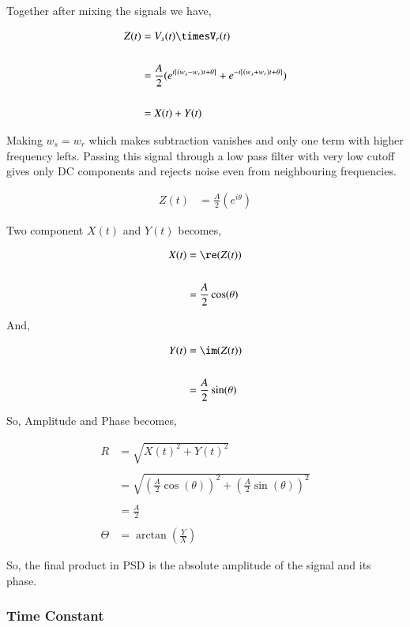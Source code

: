 Together after mixing the signals we have,

\begin{align*}
Z(t) & = V_s(t)\timesV_r(t)\\
\\
& = \frac{A}{2}(e^{i\left[ (w_s-w_r)t+\theta \right]}+e^{-i\left[ (w_s+w_r)t+\theta \right]})\\
\\
& = X(t)+Y(t)
\end{align*}

Making $w_s=w_r$ which makes subtraction vanishes and only one term with higher frequency lefts. Passing this signal through a low pass filter with very low cutoff gives only DC components and rejects noise even from neighbouring frequencies.


\begin{align*}
Z(t) & = \frac{A}{2}(e^{i \theta})
\end{align*}

Two component $X(t)$ and $Y(t)$ becomes,

\begin{align*}
X(t) & =\re(Z(t))\\
\\
& =  \frac{A}{2}\cos(\theta)
\end{align*}

And,

\begin{align*}
Y(t) & = \im(Z(t))\\
\\
& =  \frac{A}{2}\sin(\theta)
\end{align*}

So, Amplitude and Phase becomes, 

\begin{align*}
R & = \sqrt{X(t)^2+Y(t)^2}\\
\\
& =  \sqrt{(\frac{A}{2}\cos(\theta))^2+(\frac{A}{2}\sin(\theta))^2}\\
\\
& = \frac{A}{2}\\
\\
\Theta & = \arctan(\frac{Y}{X})
\end{align*}

So, the final product in PSD is the absolute amplitude of the signal and its phase. 

\subsubsection{Time Constant }

